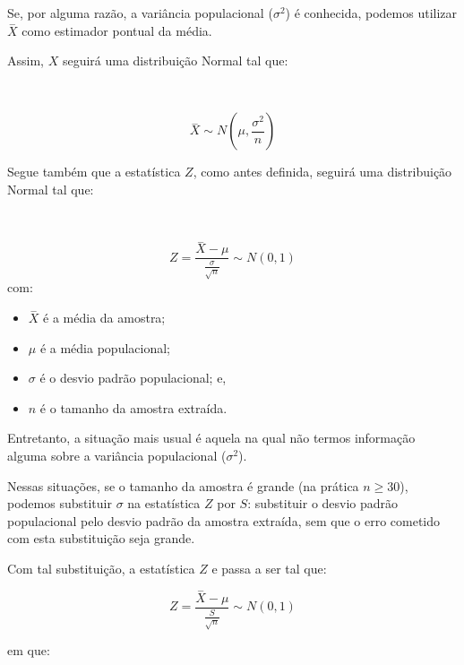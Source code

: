 \documentclass[
]{book}
\providecommand{\tightlist}{%
  \setlength{\itemsep}{0pt}\setlength{\parskip}{0pt}}
\begin{document}
\hfill\break

Se, por alguma razão, a variância populacional (\(\sigma^{2}\)) é conhecida, podemos utilizar \(\stackrel{-}{X}\) como estimador pontual da média.

\hfill\break

Assim, \(X\) seguirá uma distribuição Normal tal que:

~

\[
\stackrel{-}{X} \sim N(\mu, \frac{\sigma^{2}}{n})
\]

\hfill\break

Segue também que a estatística \(Z\), como antes definida, seguirá uma distribuição Normal tal que:

~

\[
Z = \frac{\stackrel{-}{X} - \mu}{\frac{\sigma}{\sqrt{n}}}  \sim N(0 ,1)
\]
com:

\hfill\break

\begin{itemize}
\tightlist
\item
  \(\stackrel{-}{X}\) é a média da amostra;\\
\item
  \(\mu\) é a média populacional;\\
\item
  \(\sigma\) é o desvio padrão populacional; e,\\
\item
  \(n\) é o tamanho da amostra extraída.
\end{itemize}

\hfill\break

Entretanto, a situação mais usual é aquela na qual não termos informação alguma sobre a variância populacional (\(\sigma^{2}\)).

\hfill\break

Nessas situações, se o tamanho da amostra é grande (na prática \(n\ge 30\)), podemos substituir \(\sigma\) na estatística \(Z\) por \(S\): substituir o desvio padrão populacional pelo desvio padrão da amostra extraída, sem que o erro cometido com esta substituição seja grande.

\hfill\break

Com tal substituição, a estatística \(Z\) e passa a ser tal que:

\hfill\break

\[
Z = \frac{\stackrel{-}{X} - \mu}{\frac{S}{\sqrt{n}}}  \sim N(0 , 1)
\]

\hfill\break

em que:
\end{document}
